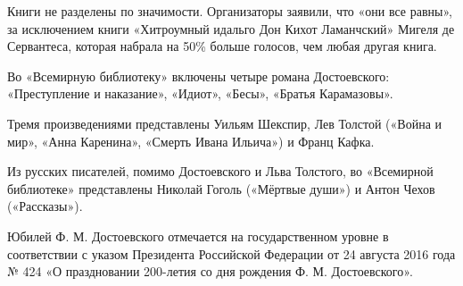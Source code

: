 Книги не разделены по значимости. Организаторы заявили, что «они все равны», за
исключением книги «Хитроумный идальго Дон Кихот Ламанчский» Мигеля де
Сервантеса, которая набрала на 50\% больше голосов, чем любая другая книга.

Во «Всемирную библиотеку» включены четыре романа Достоевского: «Преступление и
наказание», «Идиот», «Бесы», «Братья Карамазовы».

Тремя произведениями представлены Уильям Шекспир, Лев Толстой («Война и мир»,
«Анна Каренина», «Смерть Ивана Ильича») и Франц Кафка.

Из русских писателей, помимо Достоевского и Льва Толстого, во «Всемирной
библиотеке» представлены Николай Гоголь («Мёртвые души») и Антон Чехов
(«Рассказы»).

Юбилей Ф. М. Достоевского отмечается на государственном уровне в соответствии с
указом Президента Российской Федерации от 24 августа 2016 года № 424 «О
праздновании 200-летия со дня рождения Ф. М. Достоевского».
